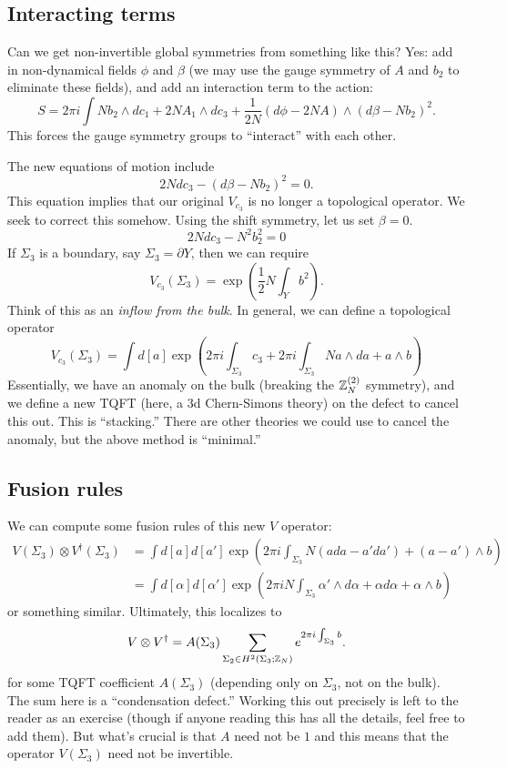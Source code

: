 \subsection{Interacting terms}

Can we get non-invertible global symmetries from something like this?
Yes: add in non-dynamical fields $\phi$ and $\beta$ (we may use the gauge symmetry of $A$ and $b_2$ to eliminate these fields), and add an interaction term to the action:
\[
	S = 2 \pi i \int N b_2 \wedge dc_1 + 2N A_1 \wedge dc_3 + \frac{1}{2N} (d\phi - 2 N A) \wedge (d\beta - N b_2)^2.
\]
This forces the gauge symmetry groups to ``interact'' with each other.

The new equations of motion include
\[
	2N dc_3 - (d\beta - Nb_2)^2 = 0.
\]
This equation implies that our original $V_{c_3}$ is no longer a topological operator.
We seek to correct this somehow. Using the shift symmetry, let us set $\beta = 0$.
\[
	2 N dc_3 - N^2b_2^2 = 0
\]
If $\Sigma_3$ is a boundary, say $\Sigma_3 = \partial Y$, then we can require
\[
	V_{c_3}(\Sigma_3) = \exp\left(\frac{1}{2} N \int_Y b^2\right).
\]
Think of this as an \emph{inflow from the bulk}. In general, we can define a topological operator
\[
	V_{c_3}(\Sigma_3) = \int d[a] \exp\left(2\pi i \int_{\Sigma_3} c_3 + 2\pi i \int_{\Sigma_3} N a \wedge da + a \wedge b\right)
\]
Essentially, we have an anomaly on the bulk (breaking the $\mathbb{Z}_N^{(2)}$ symmetry), and we define a new TQFT (here, a 3d Chern-Simons theory) on the defect to cancel this out.
This is ``stacking.''
There are other theories we could use to cancel the anomaly, but the above method is ``minimal.''

\subsection{Fusion rules}

We can compute some fusion rules of this new $V$ operator:
\begin{align*}
	V(\Sigma_3) \otimes V^\dagger(\Sigma_3) &= \int d[a] d[a'] \exp\left(2\pi i \int_{\Sigma_3} N (a da - a' da') + (a - a') \wedge b\right) \\
						&= \int d[\alpha] d[\alpha'] \exp\left(2\pi i N \int_{\Sigma_3} \alpha' \wedge d\alpha + \alpha d\alpha + \alpha \wedge b\right)
\end{align*}
or something similar.
Ultimately, this localizes to 
\[
	V \otimes V^\dagger = A(\Sigma_3) \sum_{\Sigma_2 \in H^2(\Sigma_3; \mathbb{Z}_N)} e^{2\pi i \int_{\Sigma_3} b}.
\]
for some TQFT coefficient $A(\Sigma_3)$ (depending only on $\Sigma_3$, not on the bulk). The sum here is a ``condensation defect.''
Working this out precisely is left to the reader as an exercise (though if anyone reading this has all the details, feel free to add them).
But what's crucial is that $A$ need not be $1$ and this means that the operator $V(\Sigma_3)$ need not be invertible.

